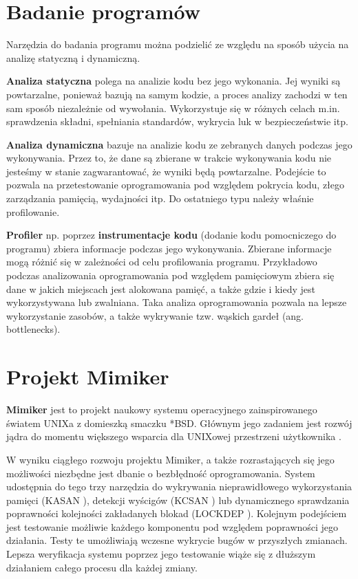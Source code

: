 \documentclass[shortabstract]{iithesis}
\theoremstyle{definition} \newtheorem*{definition}{Definicja}
\theoremstyle{definition} \newtheorem*{example}{Przykład}
\theoremstyle{definition} \newtheorem*{remark}{Uwaga}
\begin{document}
\section{Badanie programów}
Narzędzia do badania programu można podzielić ze względu na sposób użycia na analizę statyczną i dynamiczną.

\textbf{Analiza statyczna} polega na analizie kodu bez jego wykonania. Jej wyniki są powtarzalne, ponieważ bazują na samym kodzie, a proces analizy zachodzi w ten sam sposób niezależnie od wywołania. Wykorzystuje się w różnych celach m.in. sprawdzenia składni, spełniania standardów, wykrycia luk w bezpieczeństwie itp.

\textbf{Analiza dynamiczna} bazuje na analizie kodu ze zebranych danych podczas jego wykonywania. Przez to, że dane są zbierane w trakcie wykonywania kodu nie jesteśmy w stanie zagwarantować, że wyniki będą powtarzalne. Podejście to pozwala na przetestowanie oprogramowania pod względem pokrycia kodu, złego zarządzania pamięcią, wydajności itp. Do ostatniego typu należy właśnie profilowanie.

\textbf{Profiler} np. poprzez \textbf{instrumentacje kodu} (dodanie kodu pomocniczego do programu) zbiera informacje podczas jego wykonywania. Zbierane informacje mogą różnić się w zależności od celu profilowania programu. Przykładowo podczas analizowania oprogramowania pod względem pamięciowym zbiera się dane w jakich miejscach jest alokowana pamięć, a także gdzie i kiedy jest wykorzystywana lub zwalniana. Taka analiza oprogramowania pozwala na lepsze wykorzystanie zasobów, a także wykrywanie tzw. wąskich gardeł (ang. bottlenecks).

\section{Projekt Mimiker}

\textbf{Mimiker} jest to projekt naukowy systemu operacyjnego zainspirowanego światem UNIXa z domieszką smaczku *BSD. Głównym jego zadaniem jest rozwój jądra do momentu większego wsparcia dla UNIXowej przestrzeni użytkownika \cite{bib:Mimiker}.

W wyniku ciągłego rozwoju projektu Mimiker, a także rozrastających się jego możliwości niezbędne jest dbanie o bezbłędność oprogramowania. System udostępnia do tego trzy narzędzia do wykrywania nieprawidłowego wykorzystania pamięci (KASAN \cite{bib:kasan}), detekcji wyścigów (KCSAN \cite{bib:kcsan}) lub dynamicznego sprawdzania poprawności kolejności zakładanych blokad (LOCKDEP \cite{bib:lockdep}). Kolejnym podejściem jest testowanie możliwie każdego komponentu pod względem poprawności jego działania. Testy te umożliwiają wczesne wykrycie bugów w przyszłych zmianach. Lepsza weryfikacja systemu poprzez jego testowanie wiąże się z dłuższym działaniem całego procesu dla każdej zmiany. 
\end{document}
